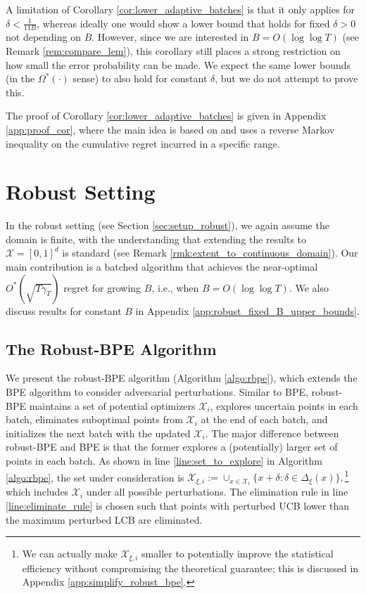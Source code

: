 \documentclass[10pt]{article}
\begin{document}
\begin{remark}
    A limitation of Corollary \ref{cor:lower_adaptive_batches} is that it only applies for $\delta < \frac{1}{11 B}$, whereas ideally one would show a lower bound that holds for fixed $\delta > 0$ not depending on $B$.  However, since we are interested in $B = O(\log \log T)$ (see Remark \ref{rem:compare_lem}), this corollary still places a strong restriction on how small the error probability can be made.  We expect the same lower bounds (in the $\Omega^*(\cdot)$ sense) to also hold for constant $\delta$, but we do not attempt to prove this.
\end{remark}
The proof of Corollary \ref{cor:lower_adaptive_batches} is given in Appendix \ref{app:proof_cor}, where the main idea is based on \citep{Scarlett17} and uses a reverse Markov inequality on the cumulative regret incurred in a specific range.

\section{Robust Setting}
\label{sec:robust}

In the robust setting (see Section \ref{sec:setup_robust}), we again assume the domain is finite, with the understanding that extending the results to $\mathcal{X}=[0,1]^d$ is standard (see Remark \ref{rmk:extent_to_continuous_domain}).
Our main contribution is a batched algorithm that achieves the near-optimal $O^*(\sqrt{T\gamma_T})$ regret for growing $B$, i.e., when $B=O(\log\log T)$. We also discuss results for constant $B$ in Appendix \ref{app:robust_fixed_B_upper_bounds}.

\subsection{The Robust-BPE Algorithm}
We present the robust-BPE algorithm (Algorithm \ref{algo:rbpe}), which extends the BPE algorithm to consider adversarial perturbations. 
Similar to BPE, robust-BPE maintains a set of potential optimizers $\mathcal{X}_i$, explores uncertain points in each batch, eliminates suboptimal points from $\mathcal{X}_i$ at the end of each batch, and initializes the next batch with the updated $\mathcal{X}_i$.
The major difference between robust-BPE and BPE is that the former explores a (potentially) larger set of points in each batch. As shown in line \ref{line:set_to_explore} in Algorithm \ref{algo:rbpe}, the set under consideration is $\mathcal{X}_{\xi, i}:= \cup_{x\in\mathcal{X}_i}\{x+\delta:\delta\in\Delta_{\xi}(x) \},$\footnote{We can actually make $\mathcal{X}_{\xi, i}$ smaller to potentially improve the statistical efficiency without compromising the theoretical guarantee; this is discussed in Appendix \ref{app:simplify_robust_bpe}.} which includes $\mathcal{X}_i$ under all possible perturbations.  The elimination rule in line \ref{line:eliminate_rule} is chosen such that points with perturbed UCB lower than the maximum perturbed LCB are eliminated. 
\end{document}
